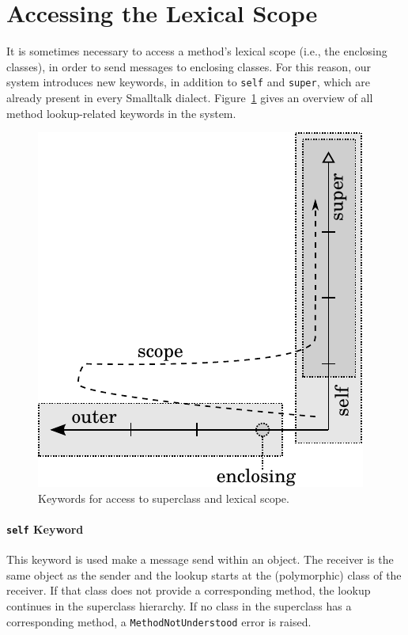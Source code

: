 
\section{Accessing the Lexical Scope}
It is sometimes necessary to access a method's lexical scope (i.e., the enclosing classes), in order to send messages to enclosing classes. For this reason, our system introduces new keywords, in addition to \texttt{self} and \texttt{super}, which are already present in every Smalltalk dialect. Figure~\ref{fig:concept_keywords} gives an overview of all method lookup-related keywords in the system.

\begin{figure}[!hbp]
	\centering
	\includegraphics[scale=1]{lookup_keywords.pdf}
	\caption{Keywords for access to superclass and lexical scope.}
	\label{fig:concept_keywords}
\end{figure}

\paragraph{\texttt{self} Keyword}
This keyword is used make a message send within an object. The receiver is the same object as the sender and the lookup starts at the (polymorphic) class of the receiver. If that class does not provide a corresponding method, the lookup continues in the superclass hierarchy. If no class in the superclass has a corresponding method, a \texttt{MethodNotUnderstood} error is raised.


